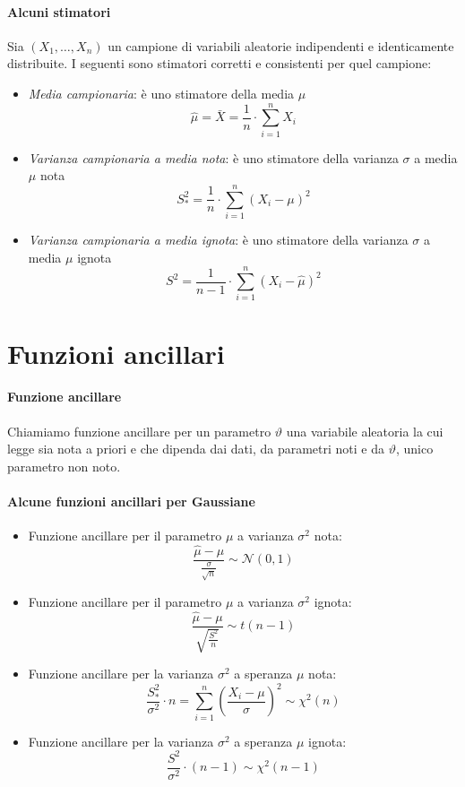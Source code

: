 \documentclass[12pt, a4paper]{report}
\theoremstyle{definition}
\begin{document}
\paragraph{Alcuni stimatori}
Sia $(X_1,\dots,X_n)$ un campione di variabili aleatorie indipendenti e
identicamente distribuite. I seguenti sono stimatori corretti e consistenti per
quel campione:
\begin{itemize}
    \item \emph{Media campionaria}: è uno stimatore della media $\mu$
    \[\hat{\mu}=\bar{X}=\frac{1}{n}\cdot\sum_{i=1}^nX_i\]
    \item \emph{Varianza campionaria a media nota}: è uno stimatore della varianza
    $\sigma$ a media $\mu$ nota
    \[S^2_*=\frac{1}{n}\cdot\sum_{i=1}^n(X_i-\mu)^2\]
    \item \emph{Varianza campionaria a media ignota}: è uno stimatore della varianza
    $\sigma$ a media $\mu$ ignota
    \[S^2=\frac{1}{n-1}\cdot\sum_{i=1}^n(X_i-\hat{\mu})^2\]
\end{itemize}

\section{Funzioni ancillari}
\paragraph{Funzione ancillare}
Chiamiamo funzione ancillare per un parametro $\vartheta$ una variabile aleatoria
la cui legge sia nota a priori e che dipenda dai dati, da parametri noti e da
$\vartheta$, unico parametro non noto.

\paragraph{Alcune funzioni ancillari per Gaussiane}
\begin{itemize}
    \item Funzione ancillare per il parametro $\mu$ a varianza $\sigma^2$ nota:
    \[\frac{\hat{\mu}-\mu}{\frac{\sigma}{\sqrt{n}}}\sim\mathcal{N}(0,1)\]
    \item Funzione ancillare per il parametro $\mu$ a varianza $\sigma^2$ ignota:
    \[\frac{\hat{\mu}-\mu}{\sqrt{\frac{S^2}{n}}}\sim t(n-1)\]
    \item Funzione ancillare per la varianza $\sigma^2$ a speranza $\mu$ nota:
    \[\frac{S^2_*}{\sigma^2}\cdot n=\sum_{i=1}^n(\frac{X_i-\mu}{\sigma})^2\sim
    \chi^2(n)\]
    \item Funzione ancillare per la varianza $\sigma^2$ a speranza $\mu$ ignota:
    \[\frac{S^2}{\sigma^2}\cdot(n-1)\sim\chi^2(n-1)\]
\end{itemize}
\end{document}
